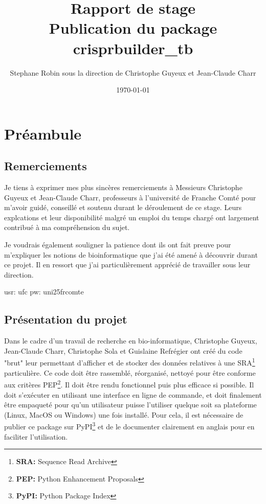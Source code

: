\documentclass[twoside,a4paper,11pt,frenchb,openany]{report}
\title{\textbf{Rapport de stage \\ Publication du package crisprbuilder\_tb}}
\author{Stephane Robin sous la direction de Christophe Guyeux et Jean-Claude Charr}
\date{\today}
\begin{document}
	
\maketitle



\tableofcontents



\chapter{Préambule}


	
\section{Remerciements}
	
Je tiens à exprimer mes plus sincères remerciements à Messieurs Christophe Guyeux et Jean-Claude Charr, professeurs à l'université de Franche Comté pour m'avoir guidé, conseillé et soutenu durant le déroulement de ce stage. Leurs explcations et leur disponibilité malgré un emploi du temps chargé ont largement contribué à ma compréhension du sujet.

Je voudrais également souligner la patience dont ils ont fait preuve pour m'expliquer les notions de bioinformatique que j'ai été amené à découvrir durant ce projet. Il en ressort que j'ai particulièrement apprécié de travailler sous leur direction.

usr: ufc
pw: uni25frcomte

\section{Présentation du projet}

Dans le cadre d'un travail de recherche en bio-informatique, Christophe Guyeux, Jean-Claude Charr, Christophe Sola et Guislaine Refrégier ont créé du code "brut" leur permettant d'afficher et de stocker des données relatives à une SRA\footnote{\textbf{SRA:} Sequence Read Archive} particulière. Ce code doit être rassemblé, réorganisé, nettoyé pour être conforme aux critères PEP\footnote{\textbf{PEP:} Python Enhancement Proposals}. Il doit être rendu fonctionnel puis plus efficace si possible. Il doit s'exécuter en utilisant une interface en ligne de commande, et doit finalement être empaqueté pour qu'un utilisateur puisse l'utiliser quelque soit sa plateforme (Linux, MacOS ou Windows) une fois installé. Pour cela, il est nécessaire de publier ce package sur PyPI\footnote{\textbf{PyPI:} Python Package Index} et de le documenter clairement en anglais pour en faciliter l'utilisation.
\end{document}
